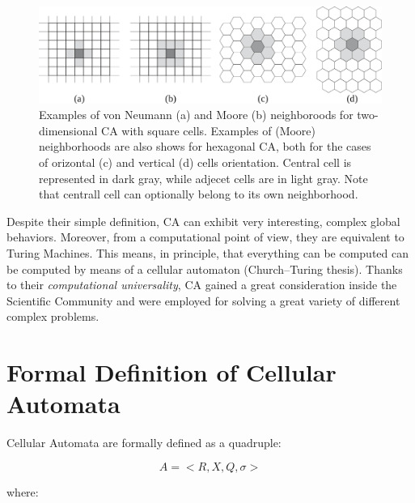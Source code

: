 \begin{figure}
  \begin{center}
    \includegraphics[width=12cm]{./images/CellularAutomata/2Dneighborhoods.png}
    \caption{Examples of von Neumann (a) and Moore (b) neighboroods
      for two-dimensional CA with square cells. Examples of (Moore)
      neighborhoods are also shows for hexagonal CA, both for the
      cases of orizontal (c) and vertical (d) cells
      orientation. Central cell is represented in dark gray, while
      adjecet cells are in light gray. Note that centrall cell can
      optionally belong to its own neighborhood.}
    \label{fig:2Dneighborhood}
  \end{center}
\end{figure}


Despite their simple definition, CA can exhibit very interesting,
complex global behaviors. Moreover, from a computational point of
view, they are equivalent to Turing Machines. This means, in
principle, that everything can be computed can be computed by means of
a cellular automaton (Church–Turing thesis). Thanks to their
\emph{computational universality}, CA gained a great consideration
inside the Scientific Community and were employed for solving a great
variety of different complex problems.

\section{Formal Definition of Cellular Automata}

Cellular Automata are formally defined as a quadruple:

$$A = <R,X,Q,\sigma>$$

\noindent where:

